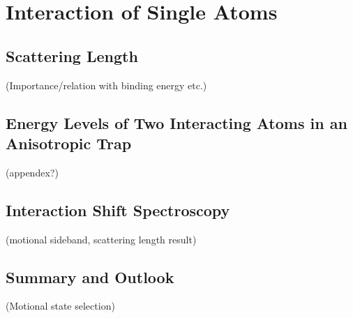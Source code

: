 
\chapter{Interaction of Single Atoms}
\label{ch:interaction-shift}

\section{Scattering Length}
(Importance/relation with binding energy etc.)

\section{Energy Levels of Two Interacting Atoms in an Anisotropic Trap}
(appendex?)

\section{Interaction Shift Spectroscopy}
(motional sideband, scattering length result)

\section{Summary and Outlook}
(Motional state selection)
